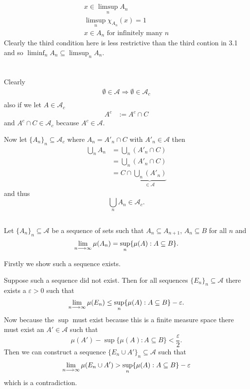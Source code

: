 \documentclass{unswmaths}
\begin{document}
\subsection{}

\begin{align*}
    x \in \limsup_{n} A_n \\
    \limsup_{n} \chi_{A_n}(x) = 1\\
    x \in A_n \text{ for infinitely many } n 
\end{align*}
Clearly the third condition here is less restrictive than the third contion in 3.1 and so $ \liminf_n A_n \subseteq \limsup_n A_n $.
\section{}
\subsection{}
Clearly
\begin{align*}
    \emptyset \in \mathcal{A} \Longrightarrow \emptyset \in \mathcal{A}_{c} \\
\end{align*}
also if we let $ A \in \mathcal{A}_{c} $
\begin{align*}
    A^{c} &:= A^{c} \cap C
\end{align*}
and $ A^{c} \cap C \in \mathcal{A}_{c} $ because $ A^{c} \in \mathcal{A} $.

Now let $ \{ A_n \}_n \subseteq \mathcal{A}_{c} $ where $ A_n = A'_n \cap C $ with $ A'_n \in \mathcal{A} $ then 
\begin{align*}
    \bigcup_{n} A_n &= \bigcup_{n} (A'_n \cap C) \\
        &= \bigcup_{n} (A'_n \cap C) \\
        &= C \cap \underbrace{\bigcup_{n} (A'_n)}_{\in \mathcal{A}}
\end{align*}
and thus 
$$
    \bigcup_{n} A_n \in \mathcal{A}_{c}.
$$
\subsection{}
Let $ \{ A_n \}_n \subseteq \mathcal{A} $ be a sequence of sets such that $ A_n \subseteq A_{n+1} $, $ A_n \subseteq B $ for all $ n $ and 
$$ \lim_{n \longrightarrow \infty} \mu(A_n) = \sup_{n} \{ \mu(A) : A \subseteq B \}. $$

Firstly we show such a sequence exists.

Suppose such a sequence did not exist. Then for all sequences $ \{E_n\}_n \subseteq \mathcal{A} $ there exists a $ \varepsilon > 0 $ such that
$$ \lim_{n\longrightarrow\infty} \mu(E_n) \leq \sup_n \{ \mu(A) : A \subseteq B \} - \varepsilon. $$ 
Now because the $ \sup $ must exist because this is a finite measure space there must exist an $ A' \in \mathcal{A} $ such that
$$ \mu(A') - \sup\{ \mu(A) : A \subseteq B \} < \frac{\varepsilon}{2}. $$ Then we can construct a sequence $ \{ E_n \cup A' \}_n \subseteq \mathcal{A} $ such that
$$
    \lim_{n\longrightarrow\infty} \mu(E_n \cup A') >  \sup_{n} \{ \mu(A) : A \subseteq B \} - \varepsilon
$$
which is a contradiction.
\end{document}
